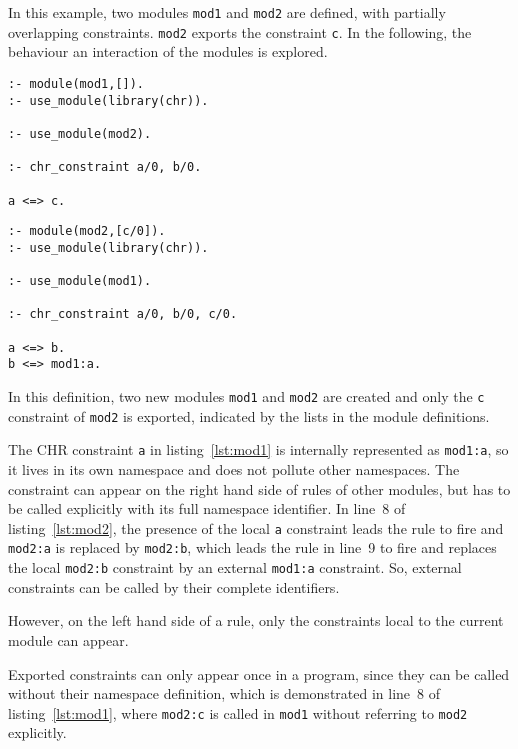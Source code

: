 \begin{example}

In this example, two modules \verb|mod1| and \verb|mod2| are defined, with partially overlapping constraints. \verb|mod2| exports the constraint \verb|c|. In the following, the behaviour an interaction of the modules is explored.

\begin{lstlisting}[caption={Definition of Module 1},label=lst:mod1]
:- module(mod1,[]).
:- use_module(library(chr)).

:- use_module(mod2).

:- chr_constraint a/0, b/0.

a <=> c.
\end{lstlisting}

\begin{lstlisting}[caption={Definition of Module 2},label=lst:mod2]
:- module(mod2,[c/0]).
:- use_module(library(chr)).

:- use_module(mod1).

:- chr_constraint a/0, b/0, c/0. 

a <=> b.
b <=> mod1:a.
\end{lstlisting}


In this definition, two new modules \verb|mod1| and \verb|mod2| are created and only the \verb|c| constraint of \verb|mod2| is exported, indicated by the lists in the module definitions.

The CHR constraint \verb|a| in listing~\ref{lst:mod1} is internally represented as \verb|mod1:a|, so it lives in its own namespace and does not pollute other namespaces. The constraint can appear on the right hand side of rules of other modules, but has to be called explicitly with its full namespace identifier. In line~8 of listing~\ref{lst:mod2}, the presence of the local \verb|a| constraint leads the rule to fire and \verb|mod2:a| is replaced by \verb|mod2:b|, which leads the rule in line~9 to fire and replaces the local \verb|mod2:b| constraint by an external \verb|mod1:a| constraint. So, external constraints can be called by their complete identifiers.

However, on the left hand side of a rule, only the constraints local to the current module can appear. 

Exported constraints can only appear once in a program, since they can be called without their namespace definition, which is demonstrated in line~8 of listing~\ref{lst:mod1}, where \verb|mod2:c| is called in \verb|mod1| without referring to \verb|mod2| explicitly.
\end{example}

